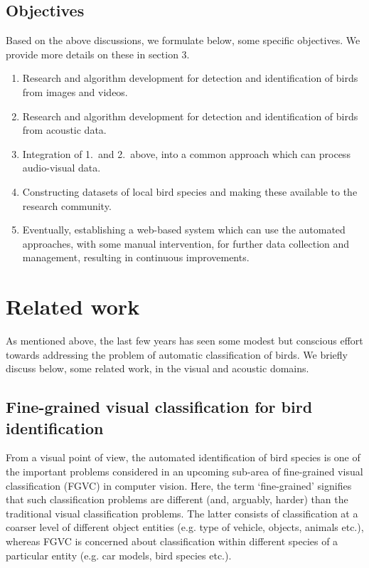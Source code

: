 \documentclass{article}
\begin{document}
\subsection{Objectives}
Based on the above discussions, we formulate below, some specific objectives. We
provide more details on these in section 3.  
\begin{enumerate}
\item Research and algorithm development for detection and identification of
birds from images and videos.
\item Research and algorithm development for detection and identification of
birds from acoustic data.
\item Integration of 1.~and 2.~above, into a common approach which can process audio-visual data. 
\item Constructing datasets of local bird species and making these available to the research community.
\item Eventually, establishing a web-based system which can use the automated
approaches, with some manual intervention, for further data collection and
management, resulting in continuous improvements.
\end{enumerate}

\section{Related work}
As mentioned above, the last few years has seen some modest but conscious effort
towards addressing the problem of automatic classification of birds. We briefly
discuss below, some related work, in the visual and acoustic domains.

\subsection{Fine-grained visual classification for bird identification}
From a visual point of view, the automated identification of bird species is one
of the important problems considered in an upcoming sub-area of fine-grained
visual classification (FGVC) in computer vision. Here, the term `fine-grained'
signifies that such classification problems are different (and, arguably,
harder) than the traditional visual classification problems. The latter consists
of classification at a coarser level of different object entities (e.g. type of
vehicle, objects, animals etc.), whereas FGVC is concerned about classification
within different species of a particular entity (e.g. car models, bird species
etc.).
\end{document}
